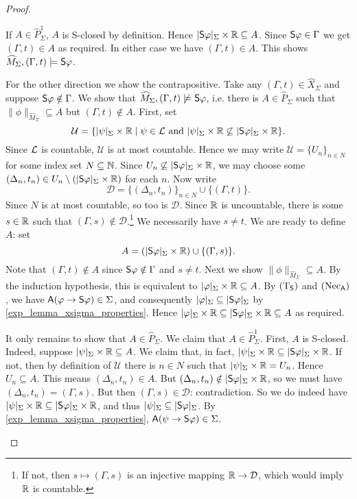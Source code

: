 \begin{proof}
\begin{itemize}
    If $A \in \widehat{P}_\Sigma^1$, $A$ is S-closed by definition.  Hence
    $|\S\phi|_\Sigma \times \R \subseteq A$. Since $\S\phi \in \Gamma$ we get
    $(\Gamma, t) \in A$ as required.
    In either case we have $(\Gamma, t) \in A$. This shows $\widehat{M}_\Sigma,
    (\Gamma, t) \models \S\phi$.

    For the other direction we show the contrapositive. Take any $(\Gamma, t)
    \in \widehat{X}_\Sigma$ and suppose $\S\phi \notin \Gamma$. We show that
    $\widehat{M}_\Sigma, (\Gamma, t) \not\models \S\phi$, i.e. there is $A \in
    \widehat{P}_\Sigma$ such that $\|\phi\|_{\widehat{M}_\Sigma} \subseteq A$
    but $(\Gamma, t) \notin A$.
    First, set
    \[
        \mathcal{U} = \{
        |\psi|_\Sigma \times \R
        \mid
        \psi \in \cL \text{ and }
        |\psi|_\Sigma \times \R \not\subseteq |\S\phi|_\Sigma \times \R
        \}.
    \]
    Since $\cL$ is countable, $\mathcal{U}$ is at most countable.
    Hence we may write $\mathcal{U} = \{U_n\}_{n \in N}$ for some
    index set $N \subseteq \N$. Since $U_n \not\subseteq
    |\S\phi|_\Sigma \times \R$, we may choose some $(\Delta_n, t_n)
    \in U_n \setminus (|\S\phi|_\Sigma \times \R)$ for each $n$. Now
    write
    \[
      \mathcal{D} = \{(\Delta_n, t_n)\}_{n \in N} \cup \{(\Gamma,
      t)\}.
    \]
    Since $N$ is at most countable, so too is $\mathcal{D}$.  Since
    $\R$ is uncountable, there is some $s \in \R$ such that $(\Gamma,
    s) \notin \mathcal{D}$.\footnote{If not, then $s \mapsto
    (\Gamma, s)$ is an injective mapping $\R \to \mathcal{D}$, which
    would imply $\R$ is countable.} We necessarily have $s \ne t$. We
    are ready to define $A$: set
    \[
      A = (|\S\phi|_\Sigma \times \R) \cup \{(\Gamma, s)\}.
    \]
    Note that $(\Gamma, t) \notin A$ since $\S\phi \notin \Gamma$ and
    $s \ne t$.
    Next we show $\|\phi\|_{\widehat{M}_\Sigma} \subseteq A$. By the
    induction hypothesis, this is equivalent to $|\phi|_\Sigma \times
    \R \subseteq A$. By $\Tsoundness$ and $\necuniv$, we have
    $\A(\phi \limplies \S\phi) \in \Sigma$, and consequently
    $|\phi|_\Sigma \subseteq |\S\phi|_\Sigma$ by
    \cref{exp_lemma_xsigma_properties}. Hence $|\phi|_\Sigma \times \R
    \subseteq |\S\phi|_\Sigma \times \R \subseteq A$ as required.

    It only remains to show that $A \in \widehat{P}_\Sigma$. We claim
    that $A \in \widehat{P}_\Sigma^1$. First, $A$ is S-closed.
    Indeed, suppose $|\psi|_\Sigma \times \R \subseteq A$. We claim
    that, in fact, $|\psi|_\Sigma \times \R \subseteq |\S\phi|_\Sigma
    \times \R$. If not, then by definition of $\mathcal{U}$ there is
    $n \in N$ such that $|\psi|_\Sigma \times \R = U_n$.  Hence $U_n
    \subseteq A$. This means $(\Delta_n, t_n) \in A$. But
    $(\Delta_n, t_n) \notin |\S\phi|_\Sigma \times \R$, so we must
    have $(\Delta_n, t_n) = (\Gamma, s)$. But then $(\Gamma, s) \in
    \mathcal{D}$: contradiction. So we do indeed have $|\psi|_\Sigma
    \times \R \subseteq |\S\phi|_\Sigma \times \R$, and thus
    $|\psi|_\Sigma \subseteq |\S\phi|_\Sigma$. By
    \cref{exp_lemma_xsigma_properties}, $\A(\psi \limplies \S\phi) \in
    \Sigma$.


\end{itemize}
\end{proof}
